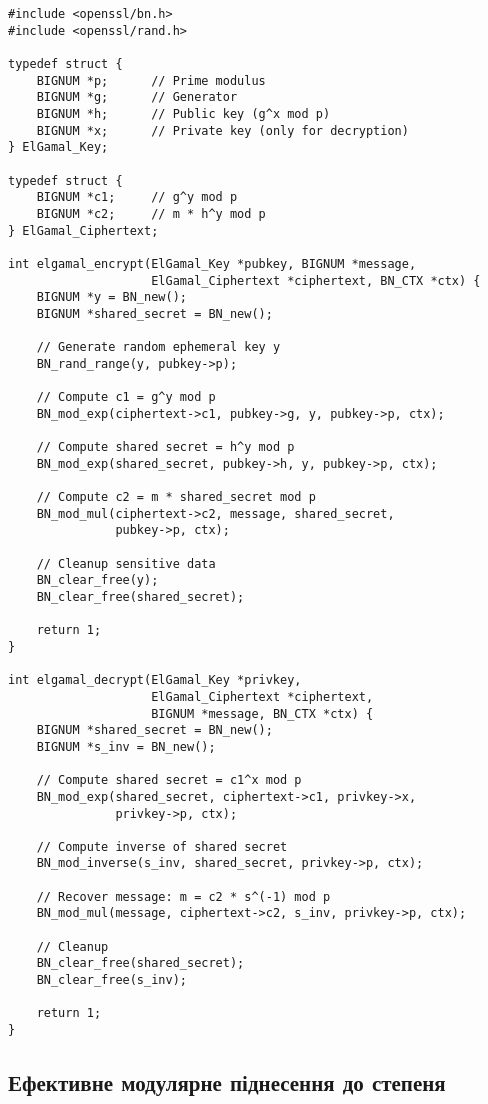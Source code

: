 \begin{verbatim}
#include <openssl/bn.h>
#include <openssl/rand.h>

typedef struct {
    BIGNUM *p;      // Prime modulus
    BIGNUM *g;      // Generator
    BIGNUM *h;      // Public key (g^x mod p)
    BIGNUM *x;      // Private key (only for decryption)
} ElGamal_Key;

typedef struct {
    BIGNUM *c1;     // g^y mod p
    BIGNUM *c2;     // m * h^y mod p
} ElGamal_Ciphertext;

int elgamal_encrypt(ElGamal_Key *pubkey, BIGNUM *message,
                    ElGamal_Ciphertext *ciphertext, BN_CTX *ctx) {
    BIGNUM *y = BN_new();
    BIGNUM *shared_secret = BN_new();
    
    // Generate random ephemeral key y
    BN_rand_range(y, pubkey->p);
    
    // Compute c1 = g^y mod p
    BN_mod_exp(ciphertext->c1, pubkey->g, y, pubkey->p, ctx);
    
    // Compute shared secret = h^y mod p
    BN_mod_exp(shared_secret, pubkey->h, y, pubkey->p, ctx);
    
    // Compute c2 = m * shared_secret mod p
    BN_mod_mul(ciphertext->c2, message, shared_secret, 
               pubkey->p, ctx);
    
    // Cleanup sensitive data
    BN_clear_free(y);
    BN_clear_free(shared_secret);
    
    return 1;
}

int elgamal_decrypt(ElGamal_Key *privkey, 
                    ElGamal_Ciphertext *ciphertext,
                    BIGNUM *message, BN_CTX *ctx) {
    BIGNUM *shared_secret = BN_new();
    BIGNUM *s_inv = BN_new();
    
    // Compute shared secret = c1^x mod p
    BN_mod_exp(shared_secret, ciphertext->c1, privkey->x, 
               privkey->p, ctx);
    
    // Compute inverse of shared secret
    BN_mod_inverse(s_inv, shared_secret, privkey->p, ctx);
    
    // Recover message: m = c2 * s^(-1) mod p
    BN_mod_mul(message, ciphertext->c2, s_inv, privkey->p, ctx);
    
    // Cleanup
    BN_clear_free(shared_secret);
    BN_clear_free(s_inv);
    
    return 1;
}
\end{verbatim}

\subsection{Ефективне модулярне піднесення до степеня}

